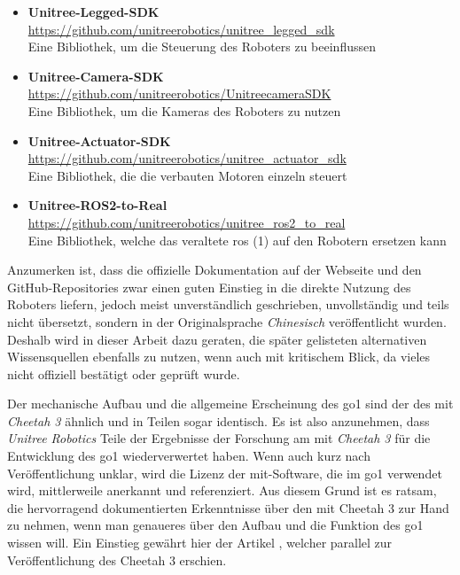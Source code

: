\begin{itemize}
    \item \textbf{Unitree-Legged-SDK}\\
    \url{https://github.com/unitreerobotics/unitree\_legged\_sdk}\\
    \textrightarrow{} Eine Bibliothek, um die Steuerung des Roboters zu beeinflussen
    \item \textbf{Unitree-Camera-SDK}\\
    \url{https://github.com/unitreerobotics/UnitreecameraSDK}\\
    \textrightarrow{} Eine Bibliothek, um die Kameras des Roboters zu nutzen
    \item \textbf{Unitree-Actuator-SDK}\\
    \url{https://github.com/unitreerobotics/unitree\_actuator\_sdk}\\
    \textrightarrow{} Eine Bibliothek, die die verbauten Motoren einzeln steuert
    \item \textbf{Unitree-ROS2-to-Real}\\
    \url{https://github.com/unitreerobotics/unitree\_ros2\_to\_real}\\
    \textrightarrow{} Eine Bibliothek, welche das veraltete \gls{ros} (1) auf den Robotern ersetzen kann
\end{itemize}

Anzumerken ist, dass die offizielle Dokumentation auf der Webseite und den GitHub-Repositories zwar einen guten Einstieg
in die direkte Nutzung des Roboters liefern, jedoch meist unverständlich geschrieben, unvollständig und teils nicht übersetzt,
sondern in der Originalsprache \emph{Chinesisch} veröffentlicht wurden.
Deshalb wird in dieser Arbeit dazu geraten, die später gelisteten alternativen Wissensquellen ebenfalls zu nutzen, wenn auch mit kritischem Blick,
da vieles nicht offiziell bestätigt oder geprüft wurde.


Der mechanische Aufbau und die allgemeine Erscheinung des \gls{go1} sind der des \gls{mit} \emph{Cheetah \num{3}} ähnlich
und in Teilen sogar identisch.
Es ist also anzunehmen, dass \emph{Unitree Robotics} Teile der Ergebnisse der Forschung am \gls{mit} \emph{Cheetah \num{3}}
für die Entwicklung des \gls{go1} wiederverwertet haben.
Wenn auch kurz nach Veröffentlichung unklar, wird die Lizenz der \gls{mit}-Software, die im \gls{go1} verwendet wird, 
mittlerweile anerkannt und referenziert.
Aus diesem Grund ist es ratsam, die hervorragend dokumentierten Erkenntnisse über den \gls{mit} Cheetah \num{3} zur Hand zu
nehmen, wenn man genaueres über den Aufbau und die Funktion des \gls{go1} wissen will.
Ein Einstieg gewährt hier der Artikel , welcher parallel zur Veröffentlichung des Cheetah \num{3}
erschien.

